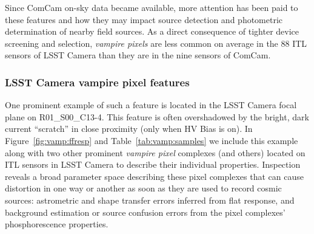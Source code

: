 Since ComCam on-sky data became available, more attention has been paid to these features and how they may impact source detection and photometric determination of nearby field sources. As a direct consequence of tighter device screening and selection, {\it vampire pixels} are less common on average in the 88 ITL sensors of LSST Camera than they are in the nine sensors of ComCam. 


\subsubsection{LSST Camera vampire pixel features}\label{lsstcam-vampire-pixel-features}

One prominent example of such a feature is located in the LSST Camera focal plane on R01\_S00\_C13-4. This feature is often overshadowed by the bright, dark current ``scratch'' in close proximity (only when HV Bias is on). In Figure~\ref{fig:vamp:ffresp} and Table~\ref{tab:vamp:samples} we include this example along with two other prominent {\it vampire pixel} complexes (and others) located on ITL sensors in LSST Camera to describe their individual properties. Inspection reveals a broad parameter space describing these pixel complexes that can cause distortion in one way or another as soon as they are used to record cosmic sources: astrometric and shape transfer errors inferred from flat response, and background estimation or source confusion errors from the pixel complexes' phosphorescence properties.




